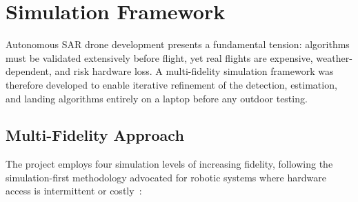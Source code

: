 \section{Simulation Framework}\label{sec:simulation}

Autonomous SAR drone development presents a fundamental tension: algorithms must be validated extensively before flight, yet real flights are expensive, weather-dependent, and risk hardware loss. A multi-fidelity simulation framework was therefore developed to enable iterative refinement of the detection, estimation, and landing algorithms entirely on a laptop before any outdoor testing.

\subsection{Multi-Fidelity Approach}\label{sec:sim-fidelity}

The project employs four simulation levels of increasing fidelity, following the simulation-first methodology advocated for robotic systems where hardware access is intermittent or costly~\cite{shah2018}:

